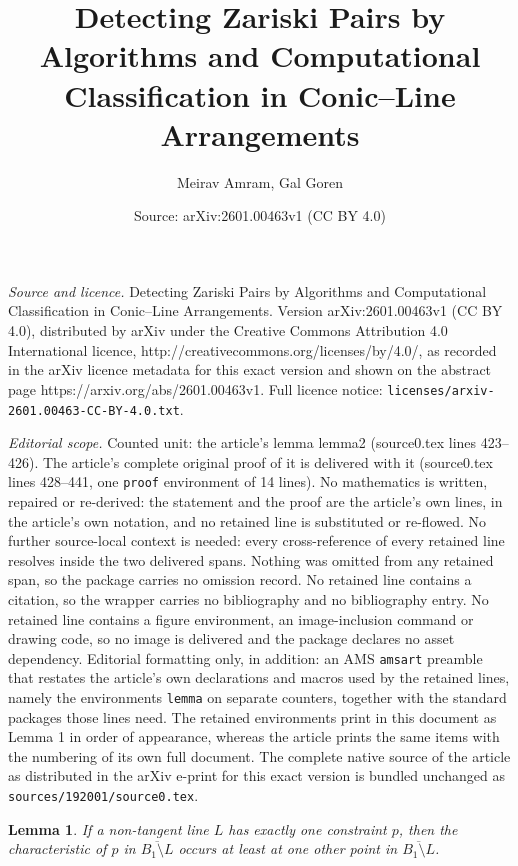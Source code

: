 \documentclass[10pt,a4paper]{amsart}
\title{Detecting Zariski Pairs by Algorithms and Computational Classification in Conic--Line Arrangements}
\author{Meirav Amram, Gal Goren}
\date{Source: arXiv:2601.00463v1 (CC BY 4.0)}
\newtheorem{lemma}{Lemma}
\begin{document}
\maketitle

\noindent\emph{Source and licence.} Detecting Zariski Pairs by Algorithms and Computational Classification in Conic--Line Arrangements. Version arXiv:2601.00463v1 (CC BY 4.0), distributed by arXiv under the Creative Commons Attribution 4.0 International licence, http://creativecommons.org/licenses/by/4.0/, as recorded in the arXiv licence metadata for this exact version and shown on the abstract page https://arxiv.org/abs/2601.00463v1. Full licence notice: \texttt{licenses/arxiv-2601.00463-CC-BY-4.0.txt}.\par\smallskip

\noindent\textit{Editorial scope.} Counted unit: the article's lemma lemma2 (source0.tex lines 423--426). The article's complete original proof of it is delivered with it (source0.tex lines 428--441, one \texttt{proof} environment of 14 lines). No mathematics is written, repaired or re-derived: the statement and the proof are the article's own lines, in the article's own notation, and no retained line is substituted or re-flowed.  No further source-local context is needed: every cross-reference of every retained line resolves inside the two delivered spans.  Nothing was omitted from any retained span, so the package carries no omission record.  No retained line contains a citation, so the wrapper carries no bibliography and no bibliography entry.  No retained line contains a figure environment, an image-inclusion command or drawing code, so no image is delivered and the package declares no asset dependency.  Editorial formatting only, in addition: an AMS \texttt{amsart} preamble that restates the article's own declarations and macros used by the retained lines, namely the environments \texttt{lemma} on separate counters, together with the standard packages those lines need.  The retained environments print in this document as Lemma 1 in order of appearance, whereas the article prints the same items with the numbering of its own full document.  The complete native source of the article as distributed in the arXiv e-print for this exact version is bundled unchanged as \texttt{sources/192001/source0.tex}.
\begin{lemma}\label{lemma2}
If a non-tangent line $L$ has exactly one constraint $p$, then the characteristic of $p$ in 
$\overline{B_1 \setminus L}$ occurs at least at one other point in $\overline{B_1 \setminus L}$.
\end{lemma}
\end{document}

